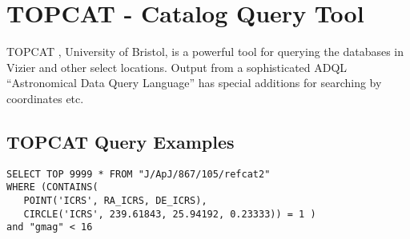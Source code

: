 \section{TOPCAT - Catalog Query Tool}

TOPCAT \cite{2005ASPC..347...29T}, University of Bristol, is a powerful
tool for querying the databases in Vizier and other select locations.
Output from a sophisticated ADQL  
``Astronomical Data Query Language'' \cite{2004ASPC..314..293Y}
has special additions for searching by coordinates etc.

\subsection{TOPCAT Query Examples}  %


\begingroup \fontsize{10pt}{10pt}
\selectfont
\begin{verbatim} 
SELECT TOP 9999 * FROM "J/ApJ/867/105/refcat2" 
WHERE (CONTAINS(
   POINT('ICRS', RA_ICRS, DE_ICRS), 
   CIRCLE('ICRS', 239.61843, 25.94192, 0.23333)) = 1 )
and "gmag" < 16
\end{verbatim}
\endgroup

